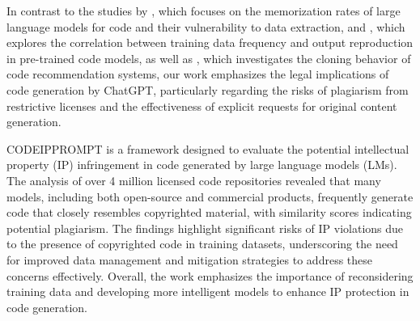 In contrast to the studies by \cite{AlKaswan:TracesMemorisation:ICSE:2024}, which focuses on the memorization rates of large language models for code and their vulnerability to data extraction, and \cite{Yang:UnveilingMemorization:ICSE:2024}, which explores the correlation between training data frequency and output reproduction in pre-trained code models, as well as \cite{Ciniselli:CloningCode:ICPC:2022}, which investigates the cloning behavior of code recommendation systems, our work emphasizes the legal implications of code generation by ChatGPT, particularly regarding the risks of plagiarism from restrictive licenses and the effectiveness of explicit requests for original content generation.

CODEIPPROMPT \cite{} is a framework designed to evaluate the potential intellectual property (IP) infringement in code generated by large language models (LMs). The analysis of over 4 million licensed code repositories revealed that many models, including both open-source and commercial products, frequently generate code that closely resembles copyrighted material, with similarity scores indicating potential plagiarism. The findings highlight significant risks of IP violations due to the presence of copyrighted code in training datasets, underscoring the need for improved data management and mitigation strategies to address these concerns effectively. Overall, the work emphasizes the importance of reconsidering training data and developing more intelligent models to enhance IP protection in code generation.


